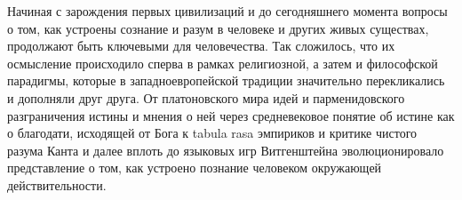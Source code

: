 
{\actuality} 


Начиная с зарождения первых цивилизаций и до сегодняшнего момента вопросы
о том, как устроены сознание и разум в человеке и других живых существах, продолжают быть ключевыми для человечества.
Так сложилось, что их осмысление происходило сперва в рамках религиозной,
а затем и философской парадигмы, которые в западноевропейской традиции значительно перекликались и дополняли друг друга.
От платоновского мира идей и парменидовского разграничения истины и мнения о ней через
средневековое понятие об истине как о благодати, исходящей от Бога к tabula rasa эмпириков
и критике чистого разума Канта и далее вплоть до языковых игр Витгенштейна эволюционировало
представление о том, как устроено познание человеком окружающей действительности.

